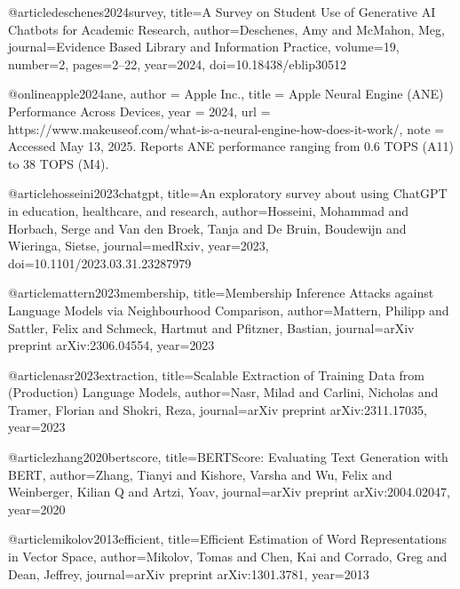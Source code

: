 @article{deschenes2024survey,
  title={A Survey on Student Use of Generative AI Chatbots for Academic Research},
  author={Deschenes, Amy and McMahon, Meg},
  journal={Evidence Based Library and Information Practice},
  volume={19},
  number={2},
  pages={2--22},
  year={2024},
  doi={10.18438/eblip30512}
}

@online{apple2024ane,
  author = {{Apple Inc.}},
  title = {Apple Neural Engine (ANE) Performance Across Devices},
  year = {2024},
  url = {https://www.makeuseof.com/what-is-a-neural-engine-how-does-it-work/},
  note = {Accessed May 13, 2025. Reports ANE performance ranging from 0.6 TOPS (A11) to 38 TOPS (M4).}
}

@article{hosseini2023chatgpt,
  title={An exploratory survey about using ChatGPT in education, healthcare, and research},
  author={Hosseini, Mohammad and Horbach, Serge and Van den Broek, Tanja and De Bruin, Boudewijn and Wieringa, Sietse},
  journal={medRxiv},
  year={2023},
  doi={10.1101/2023.03.31.23287979}
}

@article{mattern2023membership,
  title={Membership Inference Attacks against Language Models via Neighbourhood Comparison},
  author={Mattern, Philipp and Sattler, Felix and Schmeck, Hartmut and Pfitzner, Bastian},
  journal={arXiv preprint arXiv:2306.04554},
  year={2023}
}

@article{nasr2023extraction,
  title={Scalable Extraction of Training Data from (Production) Language Models},
  author={Nasr, Milad and Carlini, Nicholas and Tramer, Florian and Shokri, Reza},
  journal={arXiv preprint arXiv:2311.17035},
  year={2023}
}

@article{zhang2020bertscore,
  title={BERTScore: Evaluating Text Generation with BERT},
  author={Zhang, Tianyi and Kishore, Varsha and Wu, Felix and Weinberger, Kilian Q and Artzi, Yoav},
  journal={arXiv preprint arXiv:2004.02047},
  year={2020}
}

@article{mikolov2013efficient,
  title={Efficient Estimation of Word Representations in Vector Space},
  author={Mikolov, Tomas and Chen, Kai and Corrado, Greg and Dean, Jeffrey},
  journal={arXiv preprint arXiv:1301.3781},
  year={2013}
}
